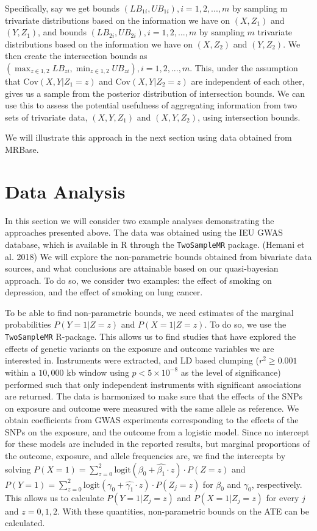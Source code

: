 \documentclass[
]{article}
\theoremstyle{plain}
\begin{document}
{Specifically, say we get bounds \((LB_{1i},UB_{1i}),i = 1,2,...,m\) by sampling m trivariate distributions based on the information we have on \((X,Z_1)\) and \((Y,Z_1)\), and bounds \((LB_{2i}, UB_{2i}),i = 1,2,...,m\) by sampling \(m\) trivariate distributions based on the information we have on \((X,Z_2)\) and \((Y,Z_2)\). We then create the intersection bounds as \(\left(\max_{z \in {1,2}} LB_{zi}, \min_{z \in {1,2}} UB_{zi}\right), i = 1, 2, ..., m\). This, under the assumption that \(\text{Cov}(X, Y | Z_1 = z)\) and \(\text{Cov}(X, Y | Z_2 = z)\) are independent of each other, gives us a sample from the posterior distribution of intersection bounds. We can use this to assess the potential usefulness of aggregating information from two sets of trivariate data, \((X, Y, Z_1)\) and \((X, Y, Z_2)\), using intersection bounds.

We will illustrate this approach in the next section using data obtained from MRBase.

\hypertarget{data-analysis}{%
\section{Data Analysis}\label{data-analysis}}

In this section we will consider two example analyses demonstrating the approaches presented above. The data was obtained using the IEU GWAS database, which is available in R through the \texttt{TwoSampleMR} package. (Hemani et al. 2018) We will explore the non-parametric bounds obtained from bivariate data sources, and what conclusions are attainable based on our quasi-bayesian approach. To do so, we consider two examples: the effect of smoking on depression, and the effect of smoking on lung cancer.

To be able to find non-parametric bounds, we need estimates of the marginal probabilities \(P(Y = 1 | Z = z)\) and \(P(X = 1 | Z = z)\). To do so, we use the \texttt{TwoSampleMR} R-package. This allows us to find studies that have explored the effects of genetic variants on the exposure and outcome variables we are interested in. Instruments were extracted, and LD based clumping (\(r^2 \ge 0.001\) within a \(10,000\) kb window using \(p < 5 \times 10^{-8}\) as the level of significance) performed such that only independent instruments with significant associations are returned. The data is harmonized to make sure that the effects of the SNPs on exposure and outcome were measured with the same allele as reference. We obtain coefficients from GWAS experiments corresponding to the effects of the SNPs on the exposure, and the outcome from a logistic model. Since no intercept for these models are included in the reported results, but marginal proportions of the outcome, exposure, and allele frequencies are, we find the intercepts by solving \(P(X = 1) = \sum_{z = 0}^2\text{logit}(\beta_0 + \hat{\beta_1}\cdot z)\cdot P(Z = z)\) and \(P(Y = 1) = \sum_{z = 0}^2\text{logit}(\gamma_0 + \hat{\gamma_1}\cdot z)\cdot P(Z_j = z)\) for \(\beta_0\) and \(\gamma_0\), respectively. This allows us to calculate \(P(Y = 1 | Z_j = z)\) and \(P(X = 1 | Z_j = z)\) for every \(j\) and \(z=0,1,2\). With these quantities, non-parametric bounds on the ATE can be calculated.

}
\end{document}

